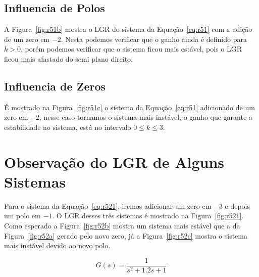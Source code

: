\documentclass[a4paper]{article}
\begin{document}
\subsection{Influencia de Polos}
A Figura~\ref{fig:r51b} mostra o LGR do sistema da Equação~\ref{eq:r51} com a adição
de um zero em $-2$. Nesta podemos verificar que o ganho ainda é definido para
$k>0$, porém podemos verificar que o sistema ficou mais estável, pois o LGR
ficou mais afastado do semi plano direito.

\subsection{Influencia de Zeros}
É mostrado na Figura~\ref{fig:r51c} o sistema da Equação~\ref{eq:r51}
adicionado de um zero em $-2$, nesse caso tornamos o sistema mais
instável, o ganho que garante a estabilidade no sistema,
está no intervalo $0\leq k \leq 3$.

\section{Observação do LGR de Alguns Sistemas}
Para o sistema da Equação~\ref{eq:r521}, iremos adicionar um zero
em $-3$ e depois um polo em $-1$. O LGR desses três sistemas é mostrado
na Figura~\ref{fig:r521}. Como esperado a Figura~\ref{fig:r52b} mostra
um sistema mais estável que a da Figura~\ref{fig:r52a} gerado pelo novo
zero, já a Figura~\ref{fig:r52c}
mostra o sistema mais instável devido ao novo polo.

\begin{equation}
   G(s)=\frac{1}{s^2+1.2s+1}
   \label{eq:r521}
\end{equation}
\end{document}
